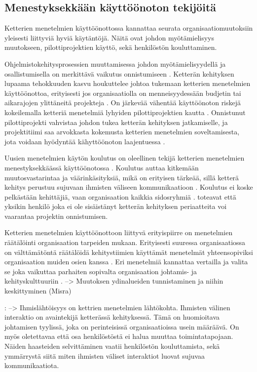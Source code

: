 \subsection{Menestyksekkään käyttöönoton tekijöitä}

Ketterien menetelmien käyttöönottossa kannattaa seurata organisaatiomuutoksiin
yleisesti liittyviä hyviä käytäntöjä. Näitä ovat johdon myötämielisyys
muutokseen, pilottiprojektien käyttö, sekä henkilöstön kouluttaminen.

Ohjelmistokehitysprosessien muuttamisessa johdon myötämielisyydellä ja
osallistumisella on merkittävä vaikutus onnistumiseen .
Ketterän kehityksen lupaama tehokkuuden kasvu houkuttelee johtoa tukemaan
ketterien menetelmien käyttöönottoa, erityisesti jos organisaatiolla on
menneisyydessään budjetin tai aikarajojen ylittäneitä projekteja
. On järkevää vähentää käyttöönoton riskejä kokeilemalla
ketteriä menetelmiä lyhyiden pilottiprojektien kautta .
Onnistunut pilottiprojekti vahvistaa johdon tukea ketterän kehityksen
jatkamiselle, ja projektitiimi saa arvokkasta kokemusta ketterien menetelmien
soveltamisesta, jota voidaan hyödyntää kähyttöönoton laajentuessa
.

Uusien menetelmien käytön koulutus on oleellinen tekijä ketterien menetelmien
menestyksekkäässä käyttöönotossa . Koulutus auttaa
kitkemään muutosvastarintaa ja väärinkäsityksiä, mikä on erityisen tärkeää,
sillä ketterä kehitys perustuu sujuvaan ihmisten väliseen kommunikaatioon
. Koulutus ei koske pelkästään kehittäjiä, vaan
organisaation kaikkia sidosryhmiä . 
toteavat että yksikin henkilö joka ei ole sisäistänyt ketterän kehityksen
periaatteita voi vaarantaa projektin onnistumisen.

Ketterien menetelmien käyttöönottoon liittyvä erityispiirre on menetelmien
räätälöinti organisaation tarpeiden mukaan. Erityisesti suuressa organisaatiossa
on välttämätöntä räätälöidä kehitystiimien käyttämät menetelmät yhteensopiviksi
organisaation muiden osien kanssa . Eri menetelmiä
kannattaa vertailla ja valita se joka vaikuttaa parhaiten sopivalta
organisaation johtamis- ja kehityskulttuuriin .
--> Muutoksen ydinalueiden tunnistaminen ja niihin keskittyminen (Misra)

:
--> Ihmislähtöisyys on kettrien menetelmien lähtökohta. Ihmisten välinen
interaktio on avaintekijä ketterässä kehityksessä. Tämä on huomioitava
johtamisen tyylissä, joka on perinteisissä organisaatioissa usein määräävä. On
myös oletettavaa että osa henkilöstöstä ei halua muuttaa toimintatapojaan.
Näiden haasteiden selvittäminen vaatii henkilöstön kouluttamista, sekä
ymmärrystä siitä miten ihmisten väliset interaktiot luovat sujuvaa
kommunikaatiota.

